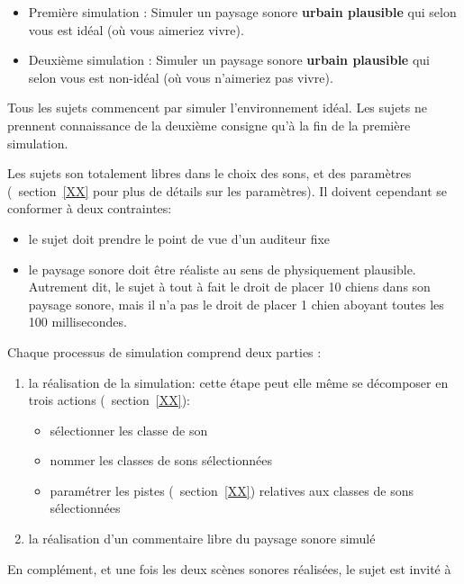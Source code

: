 \begin{itemize}
\item Première simulation : Simuler un paysage sonore \textbf{urbain plausible} qui selon vous est idéal (où vous aimeriez vivre).
\item Deuxième simulation : Simuler un paysage sonore \textbf{urbain plausible} qui selon vous est non-idéal (où vous n'aimeriez pas vivre).
\end{itemize}

Tous les sujets commencent par simuler l'environnement idéal. Les sujets ne prennent connaissance de la deuxième consigne qu'à la fin de la première simulation.

Les sujets son totalement libres dans le choix des sons, et des paramètres (\Cf~section~\ref{XX} pour plus de détails sur les paramètres). Il doivent cependant se conformer à deux contraintes:

\begin{itemize}
\item le sujet doit prendre le point de vue d’un auditeur fixe

\item le paysage sonore doit être réaliste au sens de physiquement plausible. Autrement dit, le sujet à tout à fait le droit de placer 10 chiens dans son paysage sonore, mais il n’a pas le droit de placer 1 chien aboyant toutes les 100 millisecondes.

\end{itemize}

Chaque processus de simulation comprend deux parties :

\begin{enumerate}
\item la réalisation de la simulation: cette étape peut elle même se décomposer en trois actions (\Cf~section~\ref{XX}):
\begin{itemize}
\item sélectionner les classe de son
\item nommer les classes de sons sélectionnées
\item paramétrer les pistes (\Cf~section~\ref{XX}) relatives aux classes de sons sélectionnées
\end{itemize}
\item la réalisation d'un commentaire libre du paysage sonore simulé
\end{enumerate}

En complément, et une fois les deux scènes sonores réalisées, le sujet est invité à 

